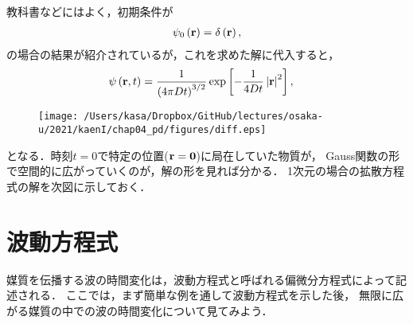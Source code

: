 教科書などにはよく，初期条件が
\begin{align}
  \psi_{0}\left({\bf r}\right) = \delta \left(\bf r\right),
\end{align}
の場合の結果が紹介されているが，これを求めた解に代入すると，
\begin{align}
\psi\left({\bf r},t\right) & =\dfrac{1}{\left(4\pi Dt\right)^{3/2}}\exp\left[-\dfrac{1}{4Dt}\left|{\bf r}\right|^{2}\right],
\end{align}
%
\begin{figure}[htbp]
 \centering
 \texttt{[image: /Users/kasa/Dropbox/GitHub/lectures/osaka-u/2021/kaenI/chap04\_pd/figures/diff.eps]} 
\end{figure}
となる．時刻$t=0$で特定の位置(${\bf r}={\bf 0}$)に局在していた物質が，
Gauss関数の形で空間的に広がっていくのが，解の形を見れば分かる．
1次元の場合の拡散方程式の解を次図に示しておく．

%
\section{波動方程式}
%
媒質を伝播する波の時間変化は，波動方程式と呼ばれる偏微分方程式によって記述される．
ここでは，まず簡単な例を通して波動方程式を示した後，
無限に広がる媒質の中での波の時間変化について見てみよう．
%
